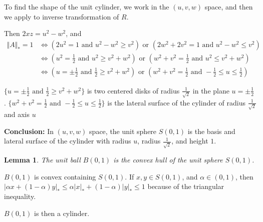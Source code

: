 \documentclass[11pt]{article}
\newcommand{\nucnorm}[1]{\Vert #1 \Vert_*}
\newtheorem{lemma}[theorem]{Lemma}
\begin{document}
To find the shape of the unit cylinder, we work in the \((u, v, w)\) space, and then we apply to inverse transformation of \(R\).


Then \(2xz = u^2 - w^2\), and
\begin{align*}
\nucnorm{A} = 1
&\iff (2 u^2 = 1 \text{ and } u^2 - w^2 \ge v^2) \text{ or }  (2 w^2 + 2 v^2 = 1 \text{ and } u^2 - w^2 \le v^2)
\\&\iff (u^2 = \frac12 \text{ and } u^2 \ge v^2 + w^2) \text{ or }  (w^2 + v^2 = \frac12 \text{ and } u^2 \le v^2 + w^2)
\\&\iff (u = \pm \frac12 \text{ and } \frac12 \ge v^2 + w^2) \text{ or }  (w^2 + v^2 = \frac12 \text{ and }-\frac12 \le u \le \frac12)
\end{align*}

\(\{u = \pm \frac12 \text{ and } \frac12 \ge v^2 + w^2\}\) is two centered disks of radius \(\frac1{\sqrt2}\) in the plane \(u=\pm \frac12\) .
\(\{w^2 + v^2 = \frac12 \text{ and }-\frac12 \le u \le \frac12\}\) is the lateral surface of the cylinder of radius \(\frac1{\sqrt 2}\) and axis \(u\)

\textbf{Conclusion:} In \((u, v, w)\) space, the unit sphere \(S(0, 1)\) is the basis and lateral surface of the cylinder with radius \(u\), radius \(\frac1{\sqrt2}\), and height \(1\).


\begin{lemma}
The unit ball \(B(0, 1)\) is the convex hull of the unit sphere \(S(0, 1)\).
\end{lemma}
\(B(0, 1)\) is convex containing \(S(0, 1)\). If \(x, y \in S(0, 1)\), and \(\alpha \in (0, 1)\), then \(|\alpha x + (1-\alpha)y|_* \le \alpha |x|_* + (1-\alpha) |y|_* \le 1\) because of the triangular inequality. 

\(B(0, 1)\) is then a cylinder.
\end{document}
